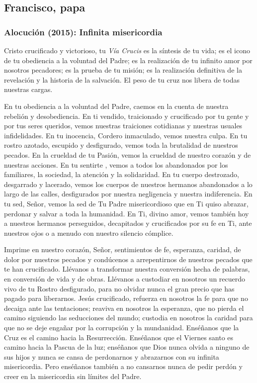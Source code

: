 \newsection
\subsection{Francisco, papa}

\subsubsection{Alocución (2015): Infinita misericordia}


\begin{body}
 Cristo crucificado y victorioso, tu \textit{Vía Crucis} es la síntesis de tu vida; es el icono de tu obediencia a la voluntad del Padre; es la realización de tu infinito amor por nosotros pecadores; es la prueba de tu misión; es la realización definitiva de la revelación y la historia de la salvación. El peso de tu cruz nos libera de todas nuestras cargas. 

En tu obediencia a la voluntad del Padre, caemos en la cuenta de nuestra rebelión y desobediencia. En ti vendido, traicionado y crucificado por tu gente y por tus seres queridos, vemos nuestras traiciones cotidianas y nuestras usuales infidelidades. En tu inocencia, Cordero inmaculado, vemos nuestra culpa. En tu rostro azotado, escupido y desfigurado, vemos toda la brutalidad de nuestros pecados. En la crueldad de tu Pasión, vemos la crueldad de nuestro corazón y de nuestras acciones. En tu sentirte , vemos a todos los abandonados por los familiares, la sociedad, la atención y la solidaridad. En tu cuerpo destrozado, desgarrado y lacerado, vemos los cuerpos de nuestros hermanos abandonados a lo largo de las calles, desfigurados por nuestra negligencia y nuestra indiferencia. En tu sed, Señor, vemos la sed de Tu Padre misericordioso que en Ti quiso abrazar, perdonar y salvar a toda la humanidad. En Ti, divino amor, vemos también hoy a nuestros hermanos perseguidos, decapitados y crucificados por su fe en Ti, ante nuestros ojos o a menudo con nuestro silencio cómplice. 

Imprime en nuestro corazón, Señor, sentimientos de fe, esperanza, caridad, de dolor por nuestros pecados y condúcenos a arrepentirnos de nuestros pecados que te han crucificado. Llévanos a transformar nuestra conversión hecha de palabras, en conversión de vida y de obras. Llévanos a custodiar en nosotros un recuerdo vivo de tu Rostro desfigurado, para no olvidar nunca el gran precio que has pagado para liberarnos. Jesús crucificado, refuerza en nosotros la fe para que no decaiga ante las tentaciones; reaviva en nosotros la esperanza, que no pierda el camino siguiendo las seducciones del mundo; custodia en nosotros la caridad para que no se deje engañar por la corrupción y la mundanidad. Enséñanos que la Cruz es el camino hacia la Resurrección. Enséñanos que el Viernes santo es camino hacia la Pascua de la luz; enséñanos que Dios nunca olvida a ninguno de sus hijos y nunca se cansa de perdonarnos y abrazarnos con su infinita misericordia. Pero enséñanos también a no cansarnos nunca de pedir perdón y creer en la misericordia sin límites del Padre. 


\end{body}
